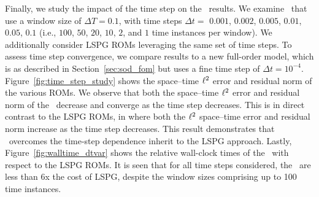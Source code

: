 Finally, we study the impact of the time step on the \methodAcronymROM\ results. We examine \methodAcronymROMs\ that use a
window size of $\Delta T = 0.1$, with time steps $\Delta t =$  $0.001$, $0.002$, $0.005$, $0.01$, $0.05$, $0.1$ (i.e.,  
$100$, $50$, $20$, $10$, $2$, and $1$ time instances per window). We additionally 
consider LSPG ROMs leveraging the same set of time steps. To assess time step convergence, we compare results to a new full-order model, which is as described in Section~\ref{sec:sod_fom} but uses a fine time step of $\Delta t = 10^{-4}$. Figure~\ref{fig:time_step_study} shows the space--time $\ell^2$ error and residual norm  
of the various ROMs. We observe that both the space--time $\ell^2$ error and residual norm 
of the \methodAcronymROMs\ decrease and converge as the time step decreases. This is in direct contrast to the LSPG ROMs, in where both the $\ell^2$ 
space--time error and residual norm increase as the time step decreases. This result 
demonstrates that \methodAcronym\ overcomes the time-step dependence inherit to the LSPG approach. Lastly, Figure~\ref{fig:walltime_dtvar}
shows the relative wall-clock times of the \methodAcronymROMs\ with respect to the LSPG ROMs. It is seen that for all time steps considered, the \methodAcronymROMs\ 
are less than 6x the cost of LSPG, despite the window sizes comprising up to 100 time instances. 
